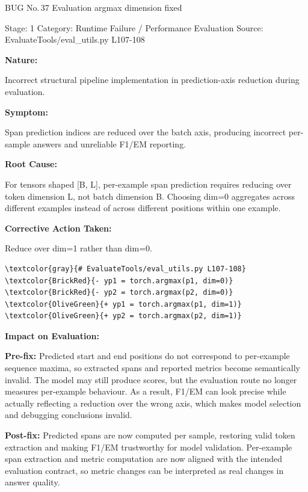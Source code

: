 \documentclass[10pt]{article}
\newcommand{\FieldLabel}[1]{%
 {\bfseries #1:}\par
}
\begin{document}
\begin{bugbox}{BUG No.\,37 \quad Evaluation argmax dimension fixed}
{\color{MetaGray}\small Stage: 1 \;\textbar\; Category: Runtime Failure / Performance Evaluation \;\textbar\; Source: EvaluateTools/eval\_utils.py L107-108\par}
\vspace{0.22em}
\FieldLabel{Nature}
Incorrect structural pipeline implementation in prediction-axis reduction during evaluation.
\par
\vspace{0.35em}
\FieldLabel{Symptom}
Span prediction indices are reduced over the batch axis, producing incorrect per-sample answers and unreliable F1/EM reporting.
\par
\vspace{0.35em}
\FieldLabel{Root Cause}
For tensors shaped {[}B, L{]}, per-example span prediction requires reducing over token dimension L, not batch dimension B. Choosing dim=0 aggregates across different examples instead of across different positions within one example.
\par
\vspace{0.35em}
\FieldLabel{Corrective Action Taken}
Reduce over dim=1 rather than dim=0.
\par
\vspace{0.35em}
\begin{Verbatim}[commandchars=\\\{\},fontsize=\footnotesize,breaklines=true,breaksymbol={},frame=leftline,framerule=2pt,rulecolor=\color{gray!40},xleftmargin=6pt,formatcom=\singlespacing]
\textcolor{gray}{# EvaluateTools/eval_utils.py L107-108}
\textcolor{BrickRed}{- yp1 = torch.argmax(p1, dim=0)}
\textcolor{BrickRed}{- yp2 = torch.argmax(p2, dim=0)}
\textcolor{OliveGreen}{+ yp1 = torch.argmax(p1, dim=1)}
\textcolor{OliveGreen}{+ yp2 = torch.argmax(p2, dim=1)}
\end{Verbatim}
\vspace{0.22em}
\FieldLabel{Impact on Evaluation}
\textbf{Pre-fix:} Predicted start and end positions do not correspond to per-example sequence maxima, so extracted spans and reported metrics become semantically invalid. The model may still produce scores, but the evaluation route no longer measures per-example behaviour. As a result, F1/EM can look precise while actually reflecting a reduction over the wrong axis, which makes model selection and debugging conclusions invalid.\par\smallskip
\textbf{Post-fix:} Predicted spans are now computed per sample, restoring valid token extraction and making F1/EM trustworthy for model validation. Per-example span extraction and metric computation are now aligned with the intended evaluation contract, so metric changes can be interpreted as real changes in answer quality.
\par
\vspace{0.35em}
\end{bugbox}
\end{document}
